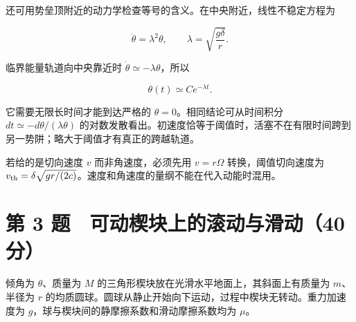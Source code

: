 \documentclass[12pt,a4paper,fontset=fandol]{ctexart}
\begin{document}
还可用势垒顶附近的动力学检查等号的含义。在中央附近，线性不稳定方程为

\[\ddot\theta=\lambda^2\theta,\qquad
\lambda=\sqrt{\frac{g\delta}{r}}.\]

临界能量轨道向中央靠近时 \(\dot\theta\simeq-\lambda\theta\)，所以

\[\theta(t)\simeq C e^{-\lambda t}.\]

它需要无限长时间才能到达严格的 \(\theta=0\)。相同结论可从时间积分
\(dt\simeq-d\theta/(\lambda\theta)\)
的对数发散看出。初速度恰等于阈值时，活塞不在有限时间跨到另一势阱；略大于阈值才有真正的跨越轨道。

若给的是切向速度 \(v\) 而非角速度，必须先用 \(v=r\Omega\)
转换，阈值切向速度为
\(v_{\rm th}=\delta\sqrt{gr/(2c)}\)。速度和角速度的量纲不能在代入动能时混用。

\clearpage

\section{第 3
题　可动楔块上的滚动与滑动（40分）}\label{ux7b2c-3-ux9898-ux53efux52a8ux6954ux5757ux4e0aux7684ux6edaux52a8ux4e0eux6ed1ux52a840ux5206}

倾角为 \(\theta\)、质量为 \(M\)
的三角形楔块放在光滑水平地面上，其斜面上有质量为 \(m\)、半径为 \(r\)
的均质圆球。圆球从静止开始向下运动，过程中楔块无转动。重力加速度为
\(g\)，球与楔块间的静摩擦系数和滑动摩擦系数均为 \(\mu\)。

\begin{center}
\begin{minipage}{\linewidth}
\centering\begingroup{}
\ifdim\wd\diagrambox>.88\linewidth
\sbox{\diagrambox}{\resizebox{.88\linewidth}{!}{\usebox{\diagrambox}}}\fi
\ifdim\ht\diagrambox>.38\textheight
\resizebox{!}{.38\textheight}{\usebox{\diagrambox}}
\else\usebox{\diagrambox}\fi
\par{}\endgroup\end{minipage}\end{center}
\end{document}
